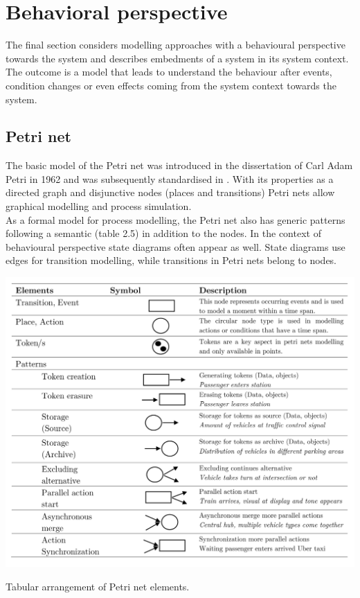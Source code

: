 


\newpage
\section{Behavioral perspective}
The final section considers modelling approaches with a behavioural perspective towards the system and describes embedments of a system in its system context. The outcome is a model that leads to understand the behaviour after events, condition changes or even effects coming from the system context towards the system.\cite{Pohl.2015}

\subsection{Petri net}
The basic model of the Petri net was introduced in the dissertation of Carl Adam Petri in 1962 \cite{Petri.1962} and was subsequently standardised in \cite{ISOIEC159091.122004}.
With its properties as a directed graph and disjunctive nodes (places and transitions) Petri nets allow graphical modelling and process simulation.\\
As a formal model for process modelling, the Petri net also has generic patterns following a semantic (table 2.5) in addition to the nodes. In the context of behavioural perspective state diagrams often appear as well. State diagrams use edges for transition modelling, while transitions in Petri nets belong to nodes. \cite{Winter.2013}\\

\begin{table}[!hb]
	\centering
	\label{tbl:TableLatexShortened}
	\includegraphics[scale=0.8]{petriTable}
	\caption{Tabular arrangement of Petri net elements.}
\end{table}

